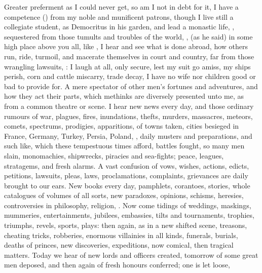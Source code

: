 {Greater preferment as I could never get, so am I not in debt for it, I
have a competence () from my noble and munificent patrons,
though I live still a collegiate student, as Democritus in his garden,
and lead a monastic life, , sequestered from those
tumults and troubles of the world, ,
(as he said) in some high place above you all, like , I hear and see what is done abroad, how others run, ride,
turmoil, and macerate themselves in court and country, far from those
wrangling lawsuits, : I laugh at all, only secure, lest my suit go amiss, my ships
perish, corn and cattle miscarry, trade decay, I have no wife nor
children good or bad to provide for. A mere spectator of other men's
fortunes and adventures, and how they act their parts, which methinks
are diversely presented unto me, as from a common theatre or scene. I
hear new news every day, and those ordinary rumours of war, plagues,
fires, inundations, thefts, murders, massacres, meteors, comets,
spectrums, prodigies, apparitions, of towns taken, cities besieged in
France, Germany, Turkey, Persia, Poland, \etc, daily musters and
preparations, and such like, which these tempestuous times afford,
battles fought, so many men slain, monomachies, shipwrecks, piracies
and sea-fights; peace, leagues, stratagems, and fresh alarms. A vast
confusion of vows, wishes, actions, edicts, petitions, lawsuits, pleas,
laws, proclamations, complaints, grievances are daily brought to our
ears. New books every day, pamphlets, corantoes, stories, whole
catalogues of volumes of all sorts, new paradoxes, opinions, schisms,
heresies, controversies in philosophy, religion, \etc. Now come tidings
of weddings, maskings, mummeries, entertainments, jubilees, embassies,
tilts and tournaments, trophies, triumphs, revels, sports, plays: then
again, as in a new shifted scene, treasons, cheating tricks, robberies,
enormous villainies in all kinds, funerals, burials, deaths of princes,
new discoveries, expeditions, now comical, then tragical matters. Today
we hear of new lords and officers created, tomorrow of some great men
deposed, and then again of fresh honours conferred; one is let loose,
}
